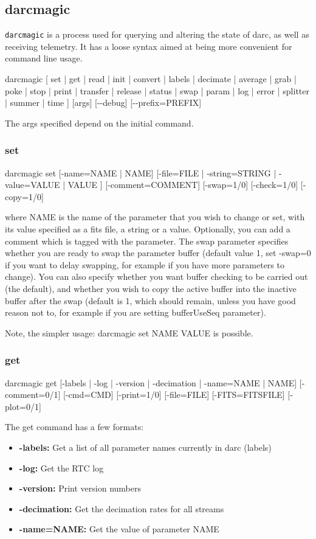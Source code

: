 \documentclass[a4,10pt]{article}
\begin{document}
\subsection{darcmagic}
{\tt darcmagic} is a process used for querying and altering the state of
darc, as well as receiving telemetry.  It has a loose syntax aimed at
being more convenient for command line usage.

darcmagic [ set | get | read | init | convert | labels | decimate |
  average | grab | poke | stop | print | transfer | release | status |
  swap | param | log | error | splitter | summer | time ] [args] [-{-}debug] [-{-}prefix=PREFIX]

The args specified depend on the initial command.

\subsubsection{set}
darcmagic set [-name=NAME | NAME] [-file=FILE |
  -string=STRING | -value=VALUE | VALUE ] [-comment=COMMENT]
[-swap=1/0] [-check=1/0] [-copy=1/0] 

where NAME is the name of the parameter that you wish to change or set,
with its value specified as a fits file, a string or a value.
Optionally, you can add a comment which is tagged with the parameter.
The swap parameter specifies whether you are ready to swap the parameter buffer
(default value 1, set
-swap=0 if you want to delay swapping, for example if you have more
parameters to change).  You can also specify whether you want buffer
checking to be carried out (the default), and whether you wish to copy
the active buffer into the inactive buffer after the swap (default is
1, which should remain, unless you have good reason not to, for
example if you are setting bufferUseSeq parameter).

Note, the simpler usage: darcmagic set NAME VALUE is possible.

\subsubsection{get}
darcmagic get [-labels | -log | -version | -decimation | -name=NAME |
  NAME] [-comment=0/1] [-cmd=CMD] [-print=1/0] [-file=FILE]
[-FITS=FITSFILE] [-plot=0/1]


The get command has a few formats:
\begin{itemize}
\item {\bf -labels:} Get a list of all parameter names currently in darc (labels)
\item {\bf -log:} Get the RTC log
\item {\bf -version:} Print version numbers
\item {\bf -decimation:} Get the decimation rates for all streams
\item {\bf -name=NAME:} Get the value of parameter NAME
\end{itemize}
\end{document}
